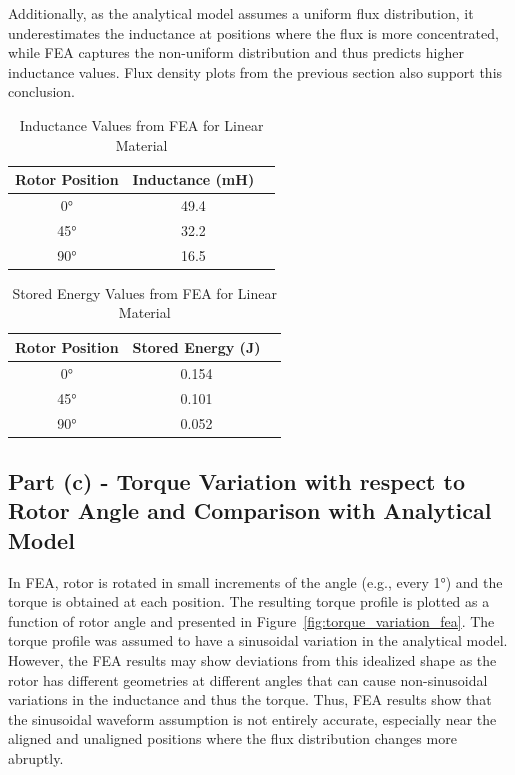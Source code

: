 \documentclass[12pt, a4paper]{article}
\begin{document}
Additionally, as the analytical model assumes a uniform flux distribution, it underestimates the inductance at positions where the flux is more concentrated, while FEA captures the non-uniform distribution and thus predicts higher inductance values. Flux density plots from the previous section also support this conclusion. 

\begin{table}[htbp]
    \centering
    \caption{Inductance Values from FEA for Linear Material}
    \label{tab:inductance_fea}
    \begin{tabular}{|c|c|c|}
        \hline
        Rotor Position & Inductance (mH) \\
        \hline
        0° & 49.4 \\
        45° & 32.2 \\
        90° & 16.5 \\
        \hline
    \end{tabular}
\end{table}

\begin{table}[htbp]
    \centering
    \caption{Stored Energy Values from FEA for Linear Material}
    \label{tab:energy_fea}
    \begin{tabular}{|c|c|c|}
        \hline
        Rotor Position & Stored Energy (J) \\
        \hline
        0° & 0.154 \\
        45° & 0.101 \\
        90° & 0.052 \\
        \hline
    \end{tabular}
\end{table}




\subsection{Part (c) - Torque Variation with respect to Rotor Angle and Comparison with Analytical Model}

In FEA, rotor is rotated in small increments of the angle (e.g., every 1°) and the torque is obtained at each position. The resulting torque profile is plotted as a function of rotor angle and presented in Figure~\ref{fig:torque_variation_fea}.  The torque profile was assumed to have a sinusoidal variation in the analytical model. However, the FEA results may show deviations from this idealized shape as the rotor has different geometries at different angles that can cause non-sinusoidal variations in the inductance and thus the torque. Thus, FEA results show that the sinusoidal waveform assumption is not entirely accurate, especially near the aligned and unaligned positions where the flux distribution changes more abruptly. 
\end{document}
